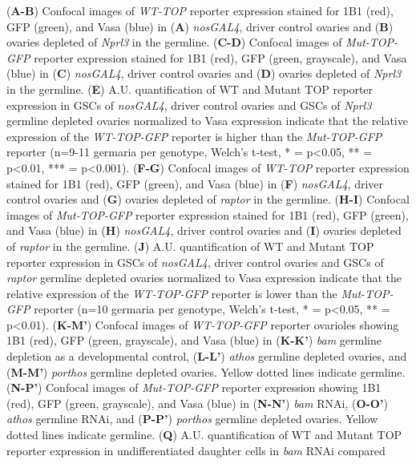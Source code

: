 \documentclass[12pt,oneside]{reedthesis}
\begin{document}
(\textbf{A-B}) Confocal images of \emph{WT-TOP} reporter expression stained for
1B1 (red), GFP (green), and Vasa (blue) in (\textbf{A}) \emph{nosGAL4}, driver
control ovaries and (\textbf{B}) ovaries depleted of \emph{Nprl3} in the germline.
(\textbf{C-D}) Confocal images of \emph{Mut-TOP-GFP} reporter expression stained
for 1B1 (red), GFP (green, grayscale), and Vasa (blue) in (\textbf{C})
\emph{nosGAL4}, driver control ovaries and (\textbf{D}) ovaries depleted of
\emph{Nprl3} in the germline. (\textbf{E}) A.U. quantification of WT and Mutant
TOP reporter expression in GSCs of \emph{nosGAL4}, driver control ovaries and
GSCs of \emph{Nprl3} germline depleted ovaries normalized to Vasa expression
indicate that the relative expression of the \emph{WT-TOP-GFP} reporter is
higher than the \emph{Mut-TOP-GFP} reporter (n=9-11 germaria per genotype,
Welch's t-test, * = p\textless0.05, ** = p\textless0.01, *** = p\textless0.001).
(\textbf{F-G}) Confocal images of \emph{WT-TOP} reporter expression stained for
1B1 (red), GFP (green), and Vasa (blue) in (\textbf{F}) \emph{nosGAL4}, driver
control ovaries and (\textbf{G}) ovaries depleted of \emph{raptor} in the
germline. (\textbf{H-I}) Confocal images of \emph{Mut-TOP-GFP} reporter expression
stained for 1B1 (red), GFP (green), and Vasa (blue) in (\textbf{H})
\emph{nosGAL4}, driver control ovaries and (\textbf{I}) ovaries depleted of
\emph{raptor} in the germline. (\textbf{J}) A.U. quantification of WT and Mutant
TOP reporter expression in GSCs of \emph{nosGAL4}, driver control ovaries and
GSCs of \emph{raptor} germline depleted ovaries normalized to Vasa expression
indicate that the relative expression of the \emph{WT-TOP-GFP} reporter is
lower than the \emph{Mut-TOP-GFP} reporter (n=10 germaria per genotype,
Welch's t-test, * = p\textless0.05, ** = p\textless0.01). (\textbf{K-M'}) Confocal
images of \emph{WT-TOP-GFP} reporter ovarioles showing 1B1 (red), GFP (green,
grayscale), and Vasa (blue) in (\textbf{K-K'}) \emph{bam} germline depletion as a
developmental control, (\textbf{L-L'}) \emph{athos} germline depleted ovaries, and
(\textbf{M-M'}) \emph{porthos} germline depleted ovaries. Yellow dotted lines
indicate germline. (\textbf{N-P'}) Confocal images of \emph{Mut-TOP-GFP} reporter
expression showing 1B1 (red), GFP (green, grayscale), and Vasa (blue) in
(\textbf{N-N'}) \emph{bam} RNAi, (\textbf{O-O'}) \emph{athos} germline RNAi, and (\textbf{P-P'})
\emph{porthos} germline depleted ovaries. Yellow dotted lines indicate
germline. (\textbf{Q}) A.U. quantification of WT and Mutant TOP reporter
expression in undifferentiated daughter cells in \emph{bam} RNAi compared
\end{document}
